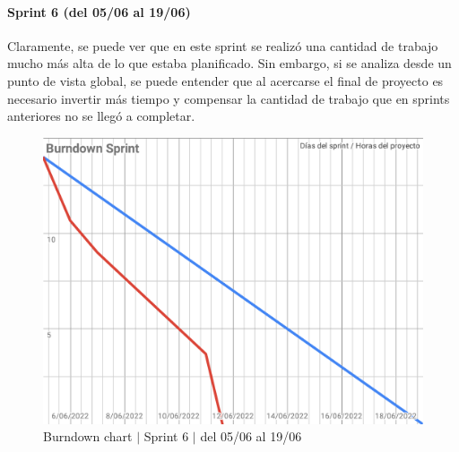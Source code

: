\paragraph{Sprint 6 (del 05/06 al 19/06)}
Claramente, se puede ver que en este sprint se realizó una cantidad de trabajo mucho más alta de lo que estaba planificado. Sin embargo, si se analiza desde un punto de vista global, se puede entender que al acercarse el final de proyecto es necesario invertir más tiempo y compensar la cantidad de trabajo que en sprints anteriores no se llegó a completar.
\begin{figure}[H]
    \centering
    \includegraphics[width=1\linewidth]{text/image/BurndownChart6.pdf}
    \caption{Burndown chart $|$ Sprint 6 $|$ del 05/06 al 19/06}
    \label{fig:burndown_chart_6}
\end{figure}

\newpage
